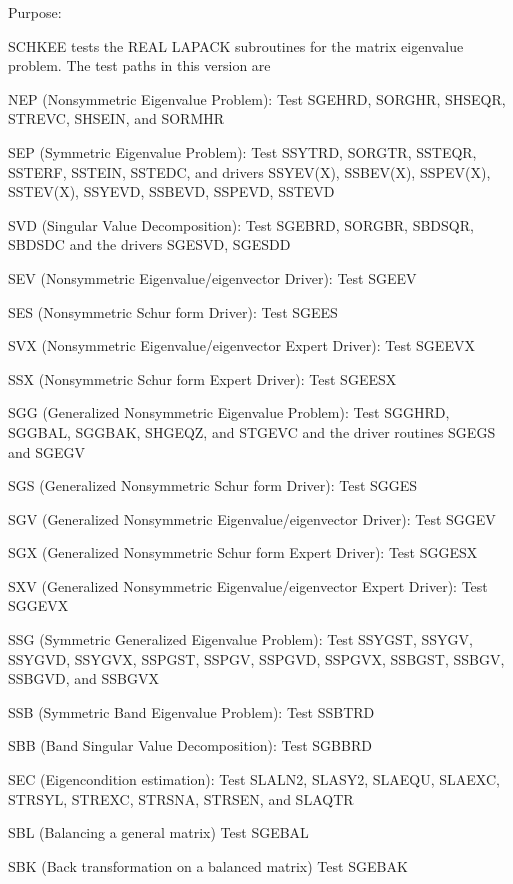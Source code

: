 \begin{DoxyParagraph}{Purpose\+: }
\begin{DoxyVerb} SCHKEE tests the REAL LAPACK subroutines for the matrix
 eigenvalue problem.  The test paths in this version are

 NEP (Nonsymmetric Eigenvalue Problem):
     Test SGEHRD, SORGHR, SHSEQR, STREVC, SHSEIN, and SORMHR

 SEP (Symmetric Eigenvalue Problem):
     Test SSYTRD, SORGTR, SSTEQR, SSTERF, SSTEIN, SSTEDC,
     and drivers SSYEV(X), SSBEV(X), SSPEV(X), SSTEV(X),
                 SSYEVD,   SSBEVD,   SSPEVD,   SSTEVD

 SVD (Singular Value Decomposition):
     Test SGEBRD, SORGBR, SBDSQR, SBDSDC
     and the drivers SGESVD, SGESDD

 SEV (Nonsymmetric Eigenvalue/eigenvector Driver):
     Test SGEEV

 SES (Nonsymmetric Schur form Driver):
     Test SGEES

 SVX (Nonsymmetric Eigenvalue/eigenvector Expert Driver):
     Test SGEEVX

 SSX (Nonsymmetric Schur form Expert Driver):
     Test SGEESX

 SGG (Generalized Nonsymmetric Eigenvalue Problem):
     Test SGGHRD, SGGBAL, SGGBAK, SHGEQZ, and STGEVC
     and the driver routines SGEGS and SGEGV

 SGS (Generalized Nonsymmetric Schur form Driver):
     Test SGGES

 SGV (Generalized Nonsymmetric Eigenvalue/eigenvector Driver):
     Test SGGEV

 SGX (Generalized Nonsymmetric Schur form Expert Driver):
     Test SGGESX

 SXV (Generalized Nonsymmetric Eigenvalue/eigenvector Expert Driver):
     Test SGGEVX

 SSG (Symmetric Generalized Eigenvalue Problem):
     Test SSYGST, SSYGV, SSYGVD, SSYGVX, SSPGST, SSPGV, SSPGVD,
     SSPGVX, SSBGST, SSBGV, SSBGVD, and SSBGVX

 SSB (Symmetric Band Eigenvalue Problem):
     Test SSBTRD

 SBB (Band Singular Value Decomposition):
     Test SGBBRD

 SEC (Eigencondition estimation):
     Test SLALN2, SLASY2, SLAEQU, SLAEXC, STRSYL, STREXC, STRSNA,
     STRSEN, and SLAQTR

 SBL (Balancing a general matrix)
     Test SGEBAL

 SBK (Back transformation on a balanced matrix)
     Test SGEBAK


\end{DoxyVerb}
\end{DoxyParagraph}
